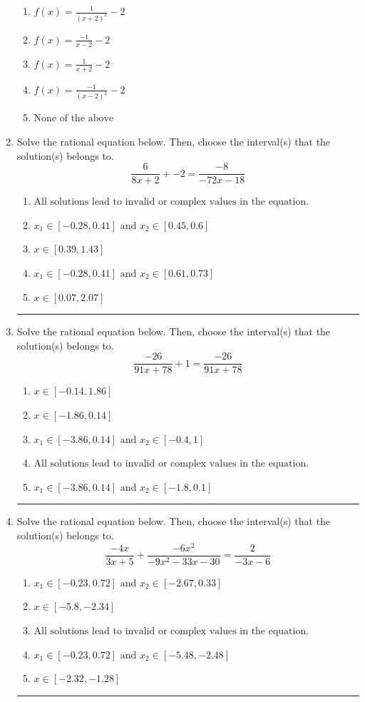 \documentclass[14pt]{extbook}
\newcommand{\litem}[1]{\item#1\hspace*{-1cm}\rule{\textwidth}{0.4pt}}
\begin{document}
\begin{enumerate}
{\begin{center}
\end{center}
\begin{enumerate}[label=\Alph*.]
\item \( f(x) = \frac{1}{(x + 2)^2} - 2 \)
\item \( f(x) = \frac{-1}{x - 2} - 2 \)
\item \( f(x) = \frac{1}{x + 2} - 2 \)
\item \( f(x) = \frac{-1}{(x - 2)^2} - 2 \)
\item \( \text{None of the above} \)

\end{enumerate} }
\litem{
Solve the rational equation below. Then, choose the interval(s) that the solution(s) belongs to.\[ \frac{6}{8x + 2} + -2 = \frac{-8}{-72x -18} \]\begin{enumerate}[label=\Alph*.]
\item \( \text{All solutions lead to invalid or complex values in the equation.} \)
\item \( x_1 \in [-0.28, 0.41] \text{ and } x_2 \in [0.45,0.6] \)
\item \( x \in [0.39,1.43] \)
\item \( x_1 \in [-0.28, 0.41] \text{ and } x_2 \in [0.61,0.73] \)
\item \( x \in [0.07,2.07] \)

\end{enumerate} }
\litem{
Solve the rational equation below. Then, choose the interval(s) that the solution(s) belongs to.\[ \frac{-26}{91x + 78} + 1 = \frac{-26}{91x + 78} \]\begin{enumerate}[label=\Alph*.]
\item \( x \in [-0.14,1.86] \)
\item \( x \in [-1.86,0.14] \)
\item \( x_1 \in [-3.86, 0.14] \text{ and } x_2 \in [-0.4,1] \)
\item \( \text{All solutions lead to invalid or complex values in the equation.} \)
\item \( x_1 \in [-3.86, 0.14] \text{ and } x_2 \in [-1.8,0.1] \)

\end{enumerate} }
\litem{
Solve the rational equation below. Then, choose the interval(s) that the solution(s) belongs to.\[ \frac{-4x}{3x + 5} + \frac{-6x^{2}}{-9x^{2} -33 x -30} = \frac{2}{-3x -6} \]\begin{enumerate}[label=\Alph*.]
\item \( x_1 \in [-0.23, 0.72] \text{ and } x_2 \in [-2.67,0.33] \)
\item \( x \in [-5.8,-2.34] \)
\item \( \text{All solutions lead to invalid or complex values in the equation.} \)
\item \( x_1 \in [-0.23, 0.72] \text{ and } x_2 \in [-5.48,-2.48] \)
\item \( x \in [-2.32,-1.28] \)


\end{enumerate}}
\end{enumerate}
\end{document}
